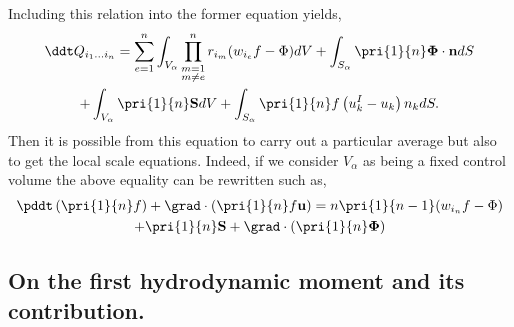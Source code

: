 Including this relation into the former equation yields, 
\begin{multline*}
    \ddt Q_{i_1\ldots i_n}
    = \sum_{e=1}^{n} \int_{V_\alpha} \prod^{n}_{\substack{ m=1 \\   m \neq e}} r_{i_m} (w_{i_e}f  - \Phi)dV
    +\int_{S_\alpha} \pri{1}{n} \mathbf{\Phi} \cdot \textbf{n}dS\\
    + \int_{V_\alpha} \pri{1}{n} \textbf{S} dV
    +\int_{S_\alpha} \pri{1}{n} f \left(u^I_k - u_k\right) n_k dS.
\end{multline*}
Then it is possible from this equation to carry out a particular average but also to get the local scale equations. 
Indeed, if we consider $V_\alpha$ as being a fixed control volume the above equality can be rewritten such as, 
\begin{multline*}
    \pddt \left(\pri{1}{n}f\right)
    + \grad \cdot \left(\pri{1}{n}f \textbf{u}\right)
    = n  \pri{1}{n-1}  (w_{i_n}f  - \Phi)\\
    + \pri{1}{n} \textbf{S} 
    + \grad \cdot \left( \pri{1}{n} \mathbf{\Phi} \right)
    \label{ap:eq:dt_rrf}
\end{multline*}


\subsection{On the first hydrodynamic moment and its contribution.}

